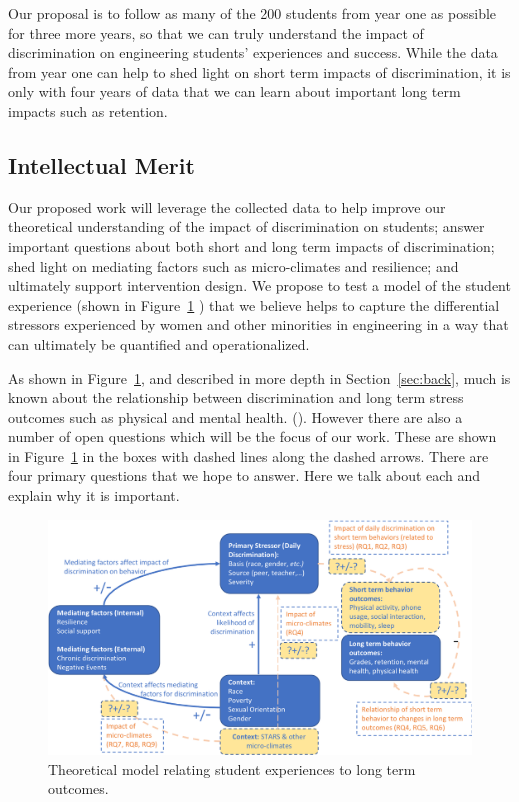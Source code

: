 Our proposal is to follow as many of the 200 students from year one as possible for three more years, so that we can truly understand the impact of discrimination on engineering students’ experiences and success. While the data from year one can help to shed light on short term impacts of discrimination, it is only with four years of data that we can learn about important long term impacts such as retention. 

\subsection{Intellectual Merit}
\label{sec:questions}

Our proposed work will leverage the collected data to help improve our theoretical understanding of the impact of discrimination on students; answer important questions about both short and long term impacts of discrimination; shed light on mediating factors such as micro-climates and resilience; and ultimately support intervention design. We  propose to test a model of the student experience (shown in Figure~\ref{fig:model} ) that we believe helps to capture the differential stressors experienced by women and other minorities in engineering in a way that can ultimately be quantified and operationalized. 

As shown in Figure~\ref{fig:model}, and described in more depth in Section~\ref{sec:back}, much is known about the relationship between discrimination and long term stress outcomes such as physical and mental health. (\eg \cite{Ong:2009}). However there are also a number of open questions which will be the focus of our work. These are shown in Figure~\ref{fig:model} in the boxes with dashed lines along the dashed arrows. There are four primary questions that we hope to answer. Here we talk about each and explain why it is important. 

\begin{figure}
    \centering
    \includegraphics[width=12cm]{img/model.png}
    \caption{Theoretical model relating student experiences to long term outcomes.}
    \label{fig:model}
\end{figure}


